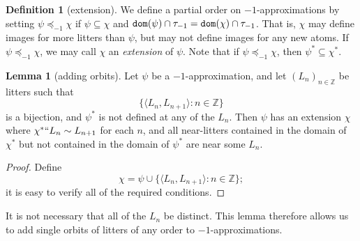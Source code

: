 \documentclass[112pt]{article}
\theoremstyle{definition}
\newtheorem{lemma}[theorem]{Lemma}
\newtheorem{definition}[theorem]{Definition}
\theoremstyle{remark}
\begin{document}
\begin{definition}[extension]
  We define a partial order on $-1$-approximations by setting $\psi \preceq_{-1} \chi$ if $\psi \subseteq \chi$ and ${\tt dom}(\psi) \cap \tau_{-1} = {\tt dom}(\chi) \cap \tau_{-1}$.
  That is, $\chi$ may define images for more litters than $\psi$, but may not define images for any new atoms.
  If $\psi \preceq_{-1} \chi$, we may call $\chi$ an {\em extension\/} of $\psi$.
  Note that if $\psi \preceq_{-1} \chi$, then $\psi^* \subseteq \chi^*$.
\end{definition}
\begin{lemma}[adding orbits]\label{lem:add_orbits}
  Let $\psi$ be a $-1$-approximation, and let $(L_n)_{n \in \mathbb Z}$ be litters such that $$\{ \langle L_n, L_{n+1} \rangle : n \in \mathbb Z \}$$ is a bijection, and $\psi^*$ is not defined at any of the $L_n$.
  Then $\psi$ has an extension $\chi$ where $\chi^* `` L_n \sim L_{n+1}$ for each $n$, and all near-litters contained  in the domain of  $\chi^*$ but not contained in the domain of $\psi^*$ are near some $L_n$.
\end{lemma}
\begin{proof}
  Define
  $$ \chi = \psi \cup \{ \langle L_n, L_{n+1} \rangle : n \in \mathbb Z \}; $$
  it is easy to verify all of the required conditions.
\end{proof}
It is not necessary that all of the $L_n$ be distinct.
This lemma therefore allows us to add single orbits of litters of any order to $-1$-approximations.
\end{document}
